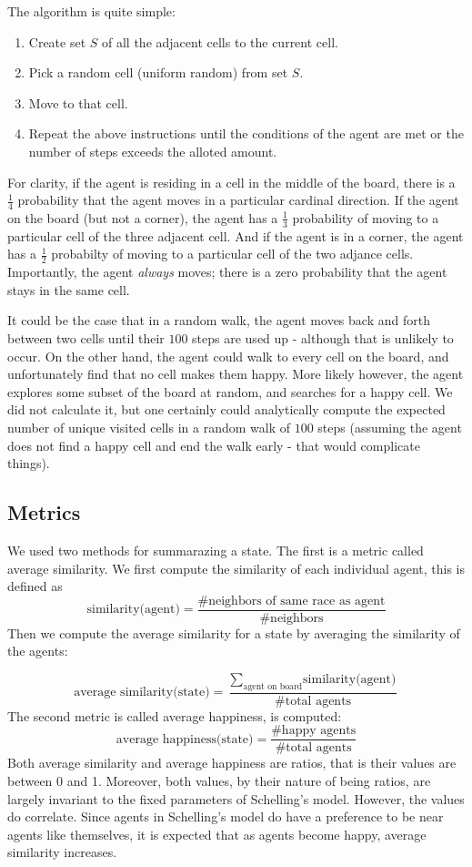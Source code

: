 \documentclass[11pt,twoside]{amsart}
\theoremstyle{theorem}
\theoremstyle{definition}
\theoremstyle{remark}
\begin{document}
The algorithm is quite simple:
\begin{enumerate}
    \item Create set $S$ of all the adjacent cells to the current cell.
    \item Pick a random cell (uniform random) from set $S$.
    \item Move to that cell. 
    \item Repeat the above instructions until the conditions of the agent are met or the number of steps exceeds the alloted amount.
\end{enumerate}

For clarity, if the agent is residing in a cell in the middle of the board, there is a $\frac{1}{4}$ probability that the agent moves in a particular cardinal direction.
If the agent on the board (but not a corner), the agent has a $\frac{1}{3}$ probability of moving to a particular cell of the three adjacent cell.
And if the agent is in a corner, the agent has a $\frac{1}{2}$ probabilty of moving to a particular cell of the two adjance cells.
Importantly, the agent \emph{always} moves; there is a zero probability that the agent stays in the same cell.

It could be the case that in a random walk, the agent moves back and forth between two cells until their $100$ steps are used up - although that is unlikely to occur. 
On the other hand, the agent could walk to every cell on the board, and unfortunately find that no cell makes them happy. 
More likely however, the agent explores some subset of the board at random, and searches for a happy cell.
We did not calculate it, but one certainly could analytically compute the expected number of unique visited cells in a random walk of $100$ steps (assuming the agent does not find a happy cell and end the walk early - that would complicate things).

\subsection{Metrics}
We used two methods for summarazing a state. 
The first is a metric called average similarity. 
We first compute the similarity of each individual agent, this is defined as
\[ \text{similarity(agent)} = \frac{\text{\# neighbors of same race as agent}}{\text{\# neighbors}} \]
Then we compute the average similarity for a state by averaging the similarity of the agents:

\[\text{average similarity(state)} = \frac{\sum_{\text{agent on board}} \text{similarity(agent)}} {\text{\# total agents}} \]
The second metric is called average happiness, is computed:
\[ \text{average happiness(state)} = \frac{\text{\# happy agents}}{\text{\# total agents}} \]
Both average similarity and average happiness are ratios, that is their values are between 0 and 1. 
Moreover, both values, by their nature of being ratios, are largely invariant to the fixed parameters of Schelling's model. 
However, the values do correlate. Since agents in Schelling's model do have a preference to be near agents like themselves, it is expected that as agents become happy, average similarity increases. 
\end{document}
